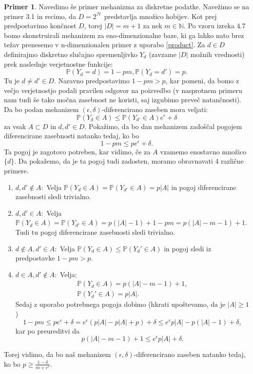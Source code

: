 \documentclass[12pt,a4paper]{amsart}
\theoremstyle{definition} %
\newtheorem{primer}[definicija]{Primer}
\theoremstyle{plain} %
\begin{document}
\begin{primer}
Navedimo še primer mehanizma za diskretne podatke. Navežimo se na primer 3.1 in recimo, da $D=2^{\mathcal{H}}$ predstavlja množico hobijev. Kot prej predpostavimo končnost $D$, torej $|D| = m + 1$ za nek $m \in \mathbb{N}$. Po vzoru izreka 4.7 bomo skonstruirali mehanizem za eno-dimenzionalne baze, ki ga lahko nato brez težav prenesemo v n-dimenzionalen primer z uporabo \eqref{product}.
\newline
\newline
Za $d \in D$ definirajmo diskretno slučajno spremenljivko $Y_d$ (zavzame $|D|$ možnih vrednosti) prek naslednje verjetnostne funkcije:
$$\mathbb{P}(Y_d=d) = 1 - pm, \mathbb{P}(Y_d=d') = p.$$
Tu je $d \neq d' \in D$. Naravno predpostavimo $1 - pm > p$, kar pomeni, da bomo z večjo verjetnostjo podali pravilen odgovor na poizvedbo (v nasprotnem primeru nam tudi še tako močna zasebnost ne koristi, saj izgubimo preveč natančnosti).
\newline
\newline
Da bo podan mehanizem $(\epsilon, \delta)$-diferencirano zaseben mora veljati:
\begin{equation}
\mathbb{P}(Y_d \in A) \leq \mathbb{P}(Y_{d'} \in A)e^{\epsilon} + \delta
\end{equation}
za vsak $A \subset D$ in $d, d' \in D$.
\newline
\newline
Pokažimo, da bo dan mehanizem zadoščal pogojem diferencirane zasebnosti natanko tedaj, ko bo $$1 - pm \leq pe^{\epsilon} + \delta.$$ Ta pogoj je zagotovo potreben, kar vidimo, če za $A$ vzamemo enostavno množico $\{d\}$. Da pokažemo, da je ta pogoj tudi zadosten, moramo obravnavati 4 različne primere.
\begin{enumerate}
\item $d,d' \notin A: $ Velja $\mathbb{P}(Y_d \in A) = \mathbb{P}(Y_{d'} \in A)= p|A|$ in pogoj diferencirane zasebnosti sledi trivialno.
\item $d,d' \in A: $ Velja $\mathbb{P}(Y_d \in A) = \mathbb{P}(Y_{d'} \in A) = p(|A| - 1) + 1 - pm=p(|A| -m -1) + 1$. Tudi tu pogoj diferencirane zasebnosti sledi trivialno.
\item $d \notin A,d' \in A: $ Velja $\mathbb{P}(Y_d \in A) \leq \mathbb{P}(Y_d' \in A)$ in pogoj sledi iz predpostavke $1 - pm > p$.
\item  $d \in A, d' \notin A: $ Velja:
\begin{gather*}
\mathbb{P}(Y_d \in A) = p(|A| -m -1) + 1, \\
\mathbb{P}(Y_d' \in A) = p|A|.
\end{gather*}
Sedaj z uporabo potrebnega pogoja dobimo (hkrati upoštevamo, da je $|A| \geq 1$)
$$1-pm\leq pe^{\epsilon} + \delta = e^{\epsilon}(p|A|-p|A|+p)+\delta \leq e^{\epsilon}p|A|-p(|A|-1)+\delta,$$
kar po preureditvi da 
$$p(|A| -m -1) + 1 \leq e^{\epsilon}p|A| + \delta.$$
\end{enumerate}
Torej vidimo, da bo naš mehanizem $(\epsilon, \delta)$-diferencirano zaseben natanko tedaj, ko bo $p \geq \frac{1-\delta}{m+e^{\epsilon}}$.

\end{primer}
\end{document}
